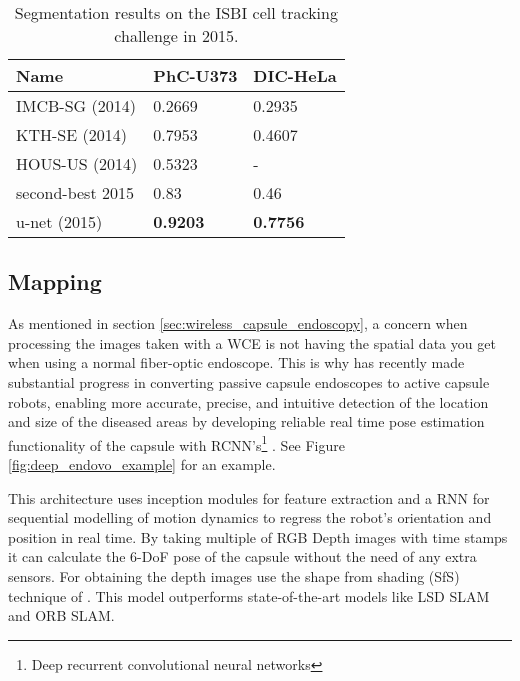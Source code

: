 \documentclass[thesis.tex]{subfiles}
\begin{document}
\begin{table} %
  \centering
  \begin{tabular}{ l l l }
  	\hline
    Name &				PhC-U373 &			DIC-HeLa 		\\
    \hline
    IMCB-SG (2014) &	0.2669 & 			0.2935 			\\
    KTH-SE (2014) &		0.7953 & 			0.4607 			\\ 
    HOUS-US (2014) &	0.5323 & 			- 				\\ 
    second-best 2015 &	0.83 & 				0.46 			\\
    u-net (2015) &		\textbf{0.9203} & 	\textbf{0.7756} \\
    \hline
  \end{tabular}
  \caption[Segmentation results on the ISBI cell tracking challenge in 2015]{Segmentation results on the ISBI cell tracking challenge in 2015.}
  \label{tab:segmentation_results}
\end{table}


\subsection{Mapping} \label{sec:mapping}
As mentioned in section \ref{sec:wireless_capsule_endoscopy}, a concern when processing the images taken with a WCE is not having the spatial data you get when using a normal fiber-optic endoscope. This is why \citeauthor*{DeepEndoVO18} has recently made substantial progress in converting passive capsule endoscopes to active capsule robots, enabling more accurate, precise, and intuitive detection of the location and size of the diseased areas by developing reliable real time pose estimation functionality of the capsule with RCNN's\footnote{Deep recurrent convolutional neural networks} \cite{DeepEndoVO18}. See Figure \ref{fig:deep_endovo_example} for an example.

This architecture uses inception modules for feature extraction and a RNN for sequential modelling of motion dynamics to regress the robot's orientation and position in real time. By taking multiple of RGB Depth images with time stamps it can calculate the 6-DoF pose of the capsule without the need of any extra sensors. For obtaining the depth images \citeauthor*{DeepEndoVO18} use the shape from shading (SfS) technique of \citeauthor{ShapeShading94} \cite{ShapeShading94}. This model outperforms state-of-the-art models like LSD SLAM and ORB SLAM.
\end{document}
